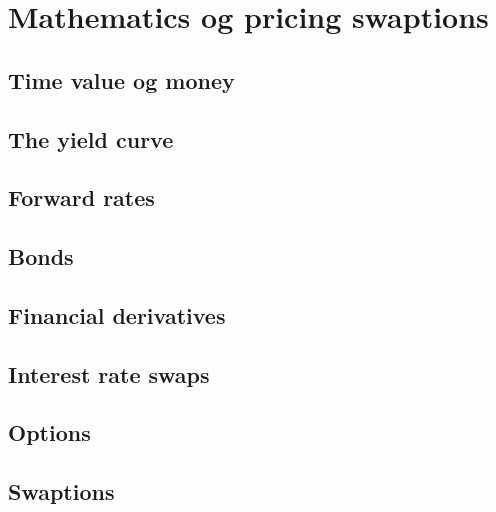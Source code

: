 \section{Mathematics og pricing swaptions}

\subsection{Time value og money}

\subsection{The yield curve}

\subsection{Forward rates}

\subsection{Bonds}

\subsection{Financial derivatives}

\subsection{Interest rate swaps}

\subsection{Options}

\subsection{Swaptions}